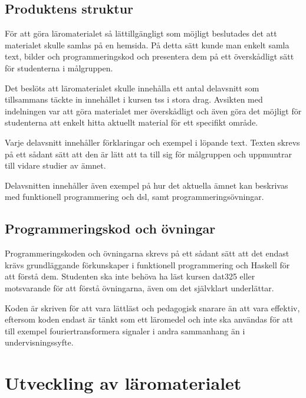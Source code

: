 \documentclass[12pt,a4paper,twoside,openright]{article}
\begin{document}
\subsection{Produktens struktur}
\label{sec:prodSpec}
För att göra läromaterialet så lättillgängligt som möjligt beslutades
det
att materialet skulle samlas på en hemsida. På detta sätt kunde man
enkelt samla text, bilder och programmeringskod och presentera dem på
ett överskådligt sätt för studenterna i målgruppen.

Det beslöts att läromaterialet skulle innehålla ett antal delavsnitt
som tillsammans täckte in innehållet i kursen \gls{tss} i stora drag.
Avsikten med indelningen var att göra materialet mer överskådligt och
även göra det möjligt för studenterna att enkelt hitta aktuellt
material för ett specifikt område.

Varje delavsnitt innehåller förklaringar och exempel i löpande
text. Texten skrevs på ett sådant sätt att den är lätt att ta till sig
för målgruppen och uppmuntrar till vidare studier av ämnet.

Delavsnitten innehåller även exempel på hur det aktuella ämnet kan
beskrivas med funktionell programmering och \gls{dsl}, samt
programmeringsövningar.

\subsection{Programmeringskod och övningar}

Programmeringskoden och övningarna skrevs på ett sådant sätt att
det endast krävs grundläggande förkunskaper i funktionell
programmering och Haskell för att förstå dem. Studenten ska inte
behöva ha läst kursen \gls{dat325} eller motsvarande för att förstå
övningarna, även om det självklart underlättar.

Koden är skriven för att vara lättläst och pedagogisk snarare
än att vara effektiv, eftersom koden endast är tänkt som ett läromedel
och inte ska användas för att till exempel fouriertransformera
signaler i andra sammanhang än i undervisningssyfte.

\newpage


\section{Utveckling av läromaterialet}
\label{sec:utveckling}

\end{document}
